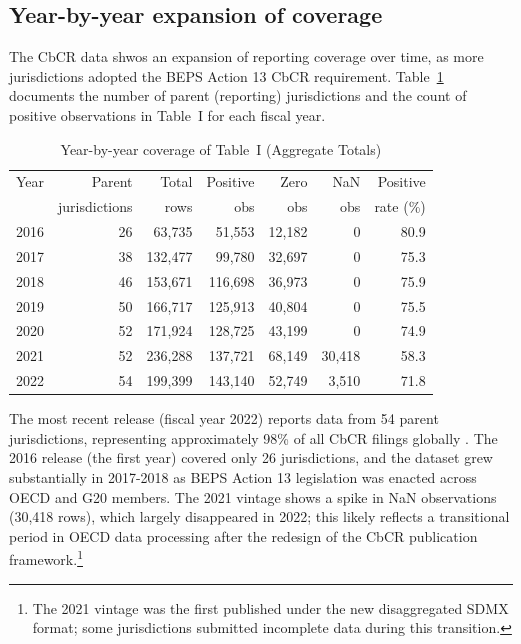 \documentclass[11pt,a4paper]{article}
\begin{document}
\subsection{Year-by-year expansion of coverage}

The CbCR data shwos an expansion of reporting coverage over time, as more jurisdictions adopted the BEPS Action 13 CbCR requirement. Table~\ref{tab:yearcoverage} documents the number of parent (reporting) jurisdictions and the count of positive observations in Table~I for each fiscal year.

\begin{table}[H]
\centering
\caption{Year-by-year coverage of Table~I (Aggregate Totals)}
\label{tab:yearcoverage}
\begin{tabular}{@{}lrrrrrr@{}}
\toprule
Year & Parent & Total & Positive & Zero & NaN & Positive \\
 & jurisdictions & rows & obs & obs & obs & rate (\%) \\
\midrule
2016 & 26 & 63,735 & 51,553 & 12,182 & 0 & 80.9 \\
2017 & 38 & 132,477 & 99,780 & 32,697 & 0 & 75.3 \\
2018 & 46 & 153,671 & 116,698 & 36,973 & 0 & 75.9 \\
2019 & 50 & 166,717 & 125,913 & 40,804 & 0 & 75.5 \\
2020 & 52 & 171,924 & 128,725 & 43,199 & 0 & 74.9 \\
2021 & 52 & 236,288 & 137,721 & 68,149 & 30,418 & 58.3 \\
2022 & 54 & 199,399 & 143,140 & 52,749 & 3,510 & 71.8 \\
\bottomrule
\end{tabular}
\end{table}

The most recent release (fiscal year 2022) reports data from 54 parent jurisdictions, representing approximately 98\% of all CbCR filings globally \citep{oecd2025corptaxstats}. The 2016 release (the first year) covered only 26 jurisdictions, and the dataset grew substantially in 2017-2018 as BEPS Action 13 legislation was enacted across OECD and G20 members. The 2021 vintage shows a spike in NaN observations (30,418 rows), which largely disappeared in
2022; this likely reflects a transitional period in OECD data processing after the
redesign of the CbCR publication framework.\footnote{The 2021 vintage was the
first published under the new disaggregated SDMX format; some jurisdictions
submitted incomplete data during this transition.}
\end{document}
